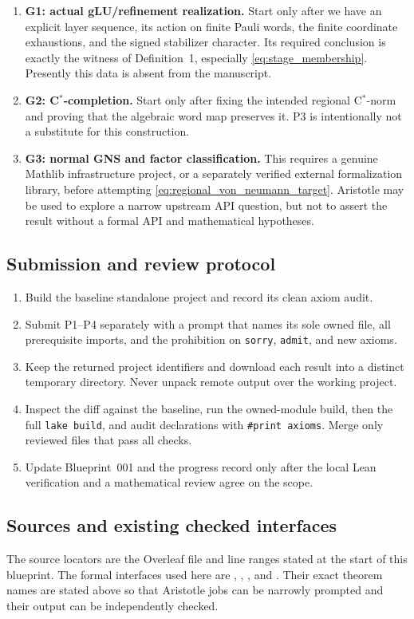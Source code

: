 \documentclass{article}
\begin{document}
\begin{enumerate}
\item \textbf{G1: actual gLU/refinement realization.}  Start only after we
  have an explicit layer sequence, its action on finite Pauli words, the
  finite coordinate exhaustions, and the signed stabilizer character.  Its
  required conclusion is exactly the witness of Definition~1, especially
  \eqref{eq:stage_membership}.  Presently this data is absent from the
  manuscript.
\item \textbf{G2: C\(^*\)-completion.}  Start only after fixing the intended
  regional C\(^*\)-norm and proving that the algebraic word map preserves it.
  P3 is intentionally not a substitute for this construction.
\item \textbf{G3: normal GNS and factor classification.}  This requires a
  genuine Mathlib infrastructure project, or a separately verified external
  formalization library, before attempting \eqref{eq:regional_von_neumann_target}.
  Aristotle may be used to explore a narrow upstream API question, but not to
  assert the result without a formal API and mathematical hypotheses.
\end{enumerate}

\subsection*{Submission and review protocol}

\begin{enumerate}
\item Build the baseline standalone project and record its clean axiom audit.
\item Submit P1--P4 separately with a prompt that names its sole owned file,
  all prerequisite imports, and the prohibition on \texttt{sorry},
  \texttt{admit}, and new axioms.
\item Keep the returned project identifiers and download each result into a
  distinct temporary directory.  Never unpack remote output over the working
  project.
\item Inspect the diff against the baseline, run the owned-module build, then
  the full \texttt{lake build}, and audit declarations with \texttt{\#print
  axioms}.  Merge only reviewed files that pass all checks.
\item Update Blueprint~001 and the progress record only after the local Lean
  verification and a mathematical review agree on the scope.
\end{enumerate}

\subsection*{Sources and existing checked interfaces}

The source locators are the Overleaf file and line ranges stated at the start
of this blueprint.  The formal interfaces used here are
,
,
, and
.  Their exact theorem names
are stated above so that Aristotle jobs can be narrowly prompted and their
output can be independently checked.
\end{document}
